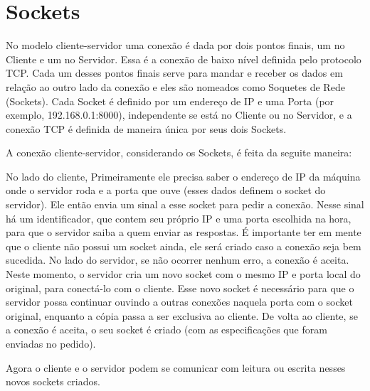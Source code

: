 \documentclass[a4paper,12pt]{article}
\begin{document}
\section{Sockets}

No modelo cliente-servidor uma conexão é dada por dois pontos finais, um no Cliente e um no Servidor. Essa é a conexão de baixo nível definida pelo protocolo TCP. Cada um desses pontos finais serve para mandar e receber os dados em relação ao outro lado da conexão e eles são nomeados como Soquetes de Rede (Sockets). Cada Socket é definido por um endereço de IP e uma Porta (por exemplo, 192.168.0.1:8000), independente se está no Cliente ou no Servidor, e a conexão TCP é definida de maneira única por seus dois Sockets.

A conexão cliente-servidor, considerando os Sockets, é feita da seguite maneira:

No lado do cliente, Primeiramente ele precisa saber o endereço de IP da máquina onde o servidor roda e a porta que ouve (esses dados definem o socket do servidor). Ele então envia um sinal a esse socket para pedir a conexão. Nesse sinal há um identificador, que contem seu próprio IP e uma porta escolhida na hora, para que o servidor saiba a quem enviar as respostas. É importante ter em mente que o cliente não possui um socket ainda, ele será criado caso a conexão seja bem sucedida.
No lado do servidor, se não ocorrer nenhum erro, a conexão é aceita. Neste momento, o servidor cria um novo socket com o mesmo IP e porta local do original, para conectá-lo com o cliente. Esse novo socket é necessário para que o servidor possa continuar ouvindo a outras conexões naquela porta com o socket original, enquanto a cópia passa a ser exclusiva ao cliente.
De volta ao cliente, se a conexão é aceita, o seu socket é criado (com as especificações que foram enviadas no pedido).

Agora o cliente e o servidor podem se comunicar com leitura ou escrita nesses novos sockets criados.


\end{document}
